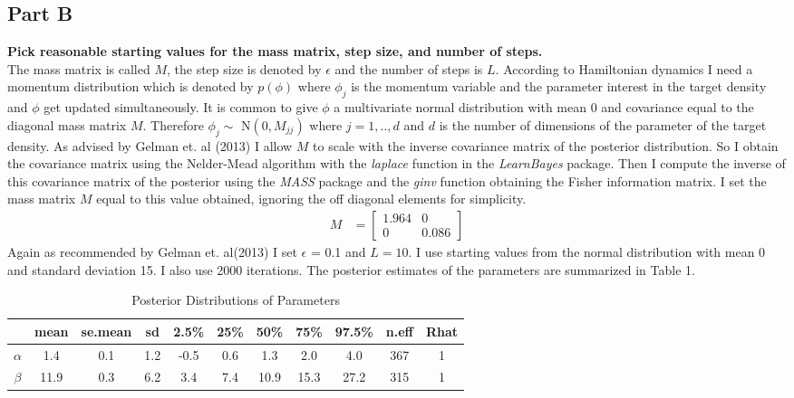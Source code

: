 \documentclass{article}
\begin{document}
\subsection{Part B}
\textbf{Pick reasonable starting values for the mass matrix, step size, and number of steps.}\\
The mass matrix is called $M$, the step size is denoted by $\epsilon$ and the number of steps is $L$. According to Hamiltonian dynamics I need a momentum distribution which is denoted by  $p(\phi)$ where $\phi_j$ is the momentum variable and the parameter interest in the target density and $\phi$ get updated simultaneously. It is common to give $\phi$ a multivariate normal distribution with mean 0 and covariance equal to the diagonal mass matrix $M$. Therefore $\phi_j \sim$ N$(0, M_{jj})$ where $j = 1,..,d$ and $d$ is the number of dimensions of the parameter of the target density. As advised by Gelman et. al (2013) I allow $M$ to scale with the inverse covariance matrix of the posterior distribution. So I obtain the covariance matrix using the Nelder-Mead algorithm with the \textit{laplace} function in the \textit{LearnBayes} package. Then I compute the inverse of this covariance matrix of the posterior using the \textit{MASS} package and the \textit{ginv} function obtaining the Fisher information matrix. I set the mass matrix $M$ equal to this value obtained, ignoring the off diagonal elements for simplicity.
\begin{align*}
M &=
\begin{bmatrix} 
1.964 & 0 \\
0 & 0.086
\end{bmatrix}
\end{align*}
Again as recommended by Gelman et. al(2013) I set $\epsilon$ = 0.1 and $L = 10$. I use starting values from the normal distribution with mean 0 and standard deviation 15. I also use 2000 iterations.
The posterior estimates of the parameters are summarized in Table 1.
\begin{table} [H]
\caption {Posterior Distributions of Parameters}
\vspace{2mm}
\def\arraystretch{1.5}
\centering \begin{tabular}{c c c c c c c c c c c} 
\hline\hline 
\vspace{1mm}
 & mean & se.mean  &  sd   & 2.5\%  &  25\% &   50\% &   75\% & 97.5\% & n.eff & Rhat \\  [0.5ex] \hline
$\alpha$   &   	1.4  &   0.1 &1.2 &-0.5 &0.6 & 1.3 & 2.0 &  4.0  & 367 &   1\\
$\beta$    &   	11.9  &   0.3  &6.2 & 3.4 &7.4 &10.9& 15.3 & 27.2 &  315 &   1
 \\
\hline 
\end{tabular}
\end{table}
\end{document}
